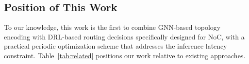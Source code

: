 \subsection{Position of This Work}

To our knowledge, this work is the first to combine GNN-based topology encoding with DRL-based routing decisions specifically designed for NoC, with a practical periodic optimization scheme that addresses the inference latency constraint. Table~\ref{tab:related} positions our work relative to existing approaches.

\begin{table}[h]
\centering
\caption{Comparison with representative works}
\label{tab:related}
\end{table}
